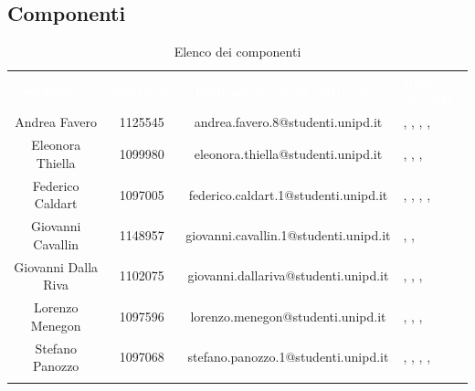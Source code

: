 \subsection{Componenti}
\begin{longtable}{ c  c  c  C{4cm} }
	\textcolor{white}{\textbf{Nominativo}} & \textcolor{white}{\textbf{Matricola}} & \textcolor{white}{\textbf{Indirizzo di posta elettronica}} & \textcolor{white}{\textbf{Ruoli previsti}}\\
	
	Andrea Favero & 1125545 & andrea.favero.8@studenti.unipd.it & \adm, \ana, \prog, \progr, \ver \\
	
	Eleonora Thiella & 1099980 & eleonora.thiella@studenti.unipd.it & \RdP, \prog, \progr, \ver \\
	
	Federico Caldart & 1097005 & federico.caldart.1@studenti.unipd.it & \RdP, \ana, \prog, \progr, \ver \\
	
	Giovanni Cavallin & 1148957 & giovanni.cavallin.1@studenti.unipd.it & \prog, \progr, \ver\\
	
	Giovanni Dalla Riva & 1102075 & giovanni.dallariva@studenti.unipd.it & \adm, \prog, \progr, \ver \\
	
	Lorenzo Menegon & 1097596 & lorenzo.menegon@studenti.unipd.it & \adm, \ana, \prog, \progr \\
	
	Stefano Panozzo & 1097068 & stefano.panozzo.1@studenti.unipd.it & \adm, \ana, \prog, \progr, \ver\\
	\caption{Elenco dei componenti}\\
\end{longtable}